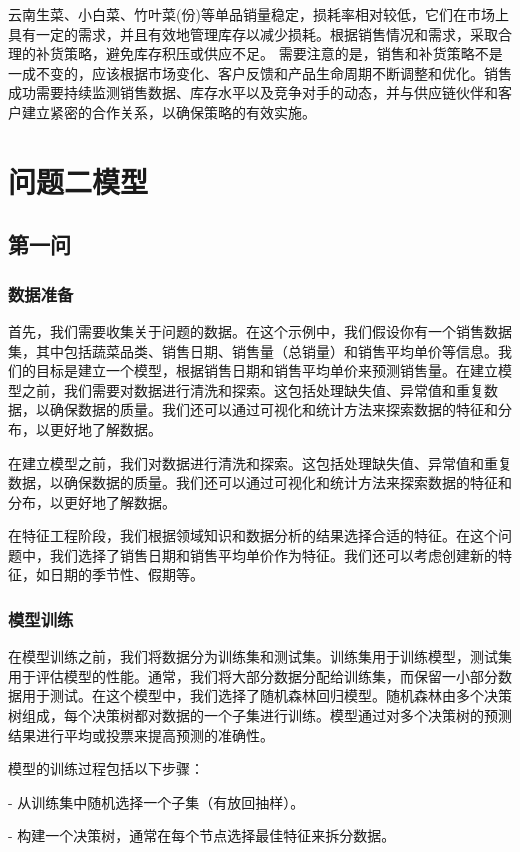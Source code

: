 \documentclass[withoutpreface,bwprint]{cumcmthesis} %
\begin{document}
	云南生菜、小白菜、竹叶菜(份)等单品销量稳定，损耗率相对较低，它们在市场上具有一定的需求，并且有效地管理库存以减少损耗。根据销售情况和需求，采取合理的补货策略，避免库存积压或供应不足。
	需要注意的是，销售和补货策略不是一成不变的，应该根据市场变化、客户反馈和产品生命周期不断调整和优化。销售成功需要持续监测销售数据、库存水平以及竞争对手的动态，并与供应链伙伴和客户建立紧密的合作关系，以确保策略的有效实施。
	
	\section{问题二模型}
	\subsection{第一问}
	\subsubsection{数据准备}
	首先，我们需要收集关于问题的数据。在这个示例中，我们假设你有一个销售数据集，其中包括蔬菜品类、销售日期、销售量（总销量）和销售平均单价等信息。我们的目标是建立一个模型，根据销售日期和销售平均单价来预测销售量。在建立模型之前，我们需要对数据进行清洗和探索。这包括处理缺失值、异常值和重复数据，以确保数据的质量。我们还可以通过可视化和统计方法来探索数据的特征和分布，以更好地了解数据。
	
	在建立模型之前，我们对数据进行清洗和探索。这包括处理缺失值、异常值和重复数据，以确保数据的质量。我们还可以通过可视化和统计方法来探索数据的特征和分布，以更好地了解数据。
	
	在特征工程阶段，我们根据领域知识和数据分析的结果选择合适的特征。在这个问题中，我们选择了销售日期和销售平均单价作为特征。我们还可以考虑创建新的特征，如日期的季节性、假期等。
		\subsubsection{模型训练}
		在模型训练之前，我们将数据分为训练集和测试集。训练集用于训练模型，测试集用于评估模型的性能。通常，我们将大部分数据分配给训练集，而保留一小部分数据用于测试。在这个模型中，我们选择了随机森林回归模型。随机森林由多个决策树组成，每个决策树都对数据的一个子集进行训练。模型通过对多个决策树的预测结果进行平均或投票来提高预测的准确性。
		
		模型的训练过程包括以下步骤：
		
		- 从训练集中随机选择一个子集（有放回抽样）。
		
		- 构建一个决策树，通常在每个节点选择最佳特征来拆分数据。
		
\end{document}
